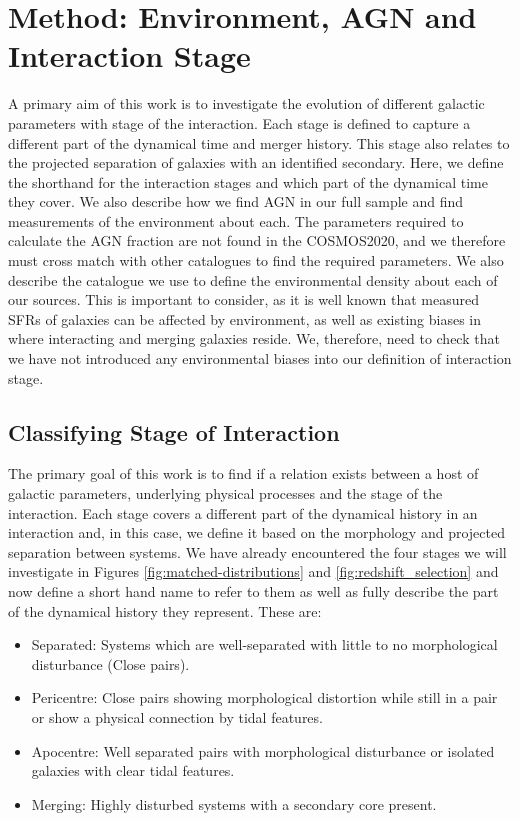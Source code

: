 \section{Method: Environment, AGN and Interaction Stage} \label{method}
A primary aim of this work is to investigate the evolution of different galactic parameters with stage of the interaction. Each stage is defined to capture a different part of the dynamical time and merger history. This stage also relates to the projected separation of galaxies with an identified secondary. Here, we define the shorthand for the interaction stages and which part of the dynamical time they cover. We also describe how we find AGN in our full sample and find measurements of the environment about each. The parameters required to calculate the AGN fraction are not found in the COSMOS2020, and we therefore must cross match with other catalogues to find the required parameters. We also describe the catalogue we use to define the environmental density about each of our sources. This is important to consider, as it is well known that measured SFRs of galaxies can be affected by environment, as well as existing biases in where interacting and merging galaxies reside. We, therefore, need to check that we have not introduced any environmental biases into our definition of interaction stage. 

\subsection{Classifying Stage of Interaction}\label{sec:staging}
The primary goal of this work is to find if a relation exists between a host of galactic parameters, underlying physical processes and the stage of the interaction. Each stage covers a different part of the dynamical history in an interaction and, in this case, we define it based on the morphology and projected separation between systems. We have already encountered the four stages we will investigate in Figures \ref{fig:matched-distributions} and \ref{fig:redshift_selection} and now define a short hand name to refer to them as well as fully describe the part of the dynamical history they represent. These are:

\begin{itemize}
\item Separated: Systems which are well-separated with little to no morphological disturbance (Close pairs).
\item Pericentre: Close pairs showing morphological distortion while still in a pair or show a physical connection by tidal features.
\item Apocentre: Well separated pairs with morphological disturbance or isolated galaxies with clear tidal features.
\item Merging: Highly disturbed systems with a secondary core present.
\end{itemize}

